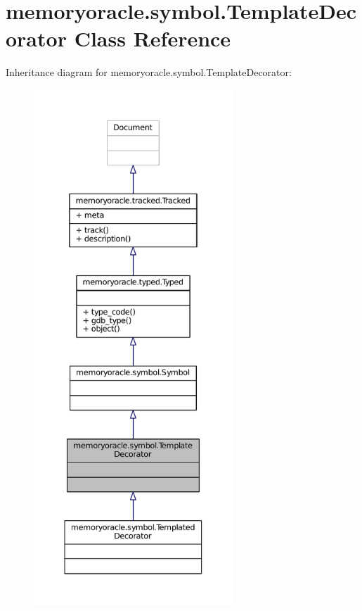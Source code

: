 \hypertarget{classmemoryoracle_1_1symbol_1_1TemplateDecorator}{}\section{memoryoracle.\+symbol.\+Template\+Decorator Class Reference}
\label{classmemoryoracle_1_1symbol_1_1TemplateDecorator}


Inheritance diagram for memoryoracle.\+symbol.\+Template\+Decorator\+:
\nopagebreak
\begin{figure}[H]
\begin{center}
\leavevmode
\includegraphics[height=550pt]{classmemoryoracle_1_1symbol_1_1TemplateDecorator__inherit__graph}
\end{center}
\end{figure}


